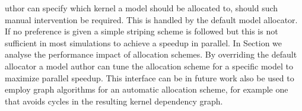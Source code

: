 uthor can specify which kernel a model should be allocated to, should such manual intervention be required. This is handled by the default model allocator. If no preference is given a simple striping scheme is followed but this is not sufficient in most simulations to achieve a speedup in parallel. In Section  we analyse the performance impact of allocation schemes. By overriding the default allocator a model author can tune the allocation scheme for a specific model to maximize parallel speedup. This interface can be in future work also be used to employ graph algorithms for an automatic allocation scheme, for example one that avoids cycles in the resulting kernel dependency graph.
